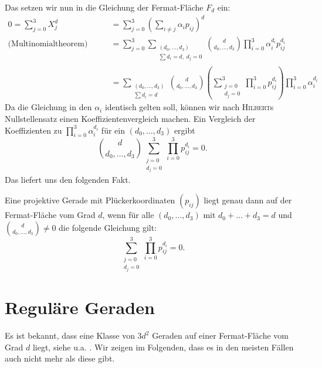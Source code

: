 Das setzen wir nun in die Gleichung der Fermat-Fläche $F_d$ ein:
\begin{align*}
0 = \sum_{j=0}^3 X_j^d &= \sum_{j=0}^3 \left(\sum_{i \neq j} \alpha_i p_{ij} \right)^d \\
\text{(Multinomialtheorem)}\qquad &= \sum_{j=0}^3 \sum_{\substack{(d_0,\dots,d_3) \\ \sum d_i=d,\;d_j=0}} \binom d{d_0,\dots,d_3} \prod_{i=0}^3 \alpha_i^{d_i} p_{ij}^{d_i} \\
	&= \sum_{\substack{(d_0,\dots,d_3) \\ \sum d_i=d}} \binom d{d_0,\dots,d_3} \left(\sum_{\substack{j=0 \\ d_j=0}}^3 \prod_{i=0}^3 p_{ij}^{d_i} \right) \prod_{i=0}^3 \alpha_i^{d_i}
\end{align*}
Da die Gleichung in den $\alpha_i$ identisch gelten soll, können wir nach \textsc{Hilbert}s Nullstellensatz einen Koeffizientenvergleich machen. Ein Vergleich der Koeffizienten zu $\prod_{i=0}^3 \alpha_i^{d_i}$ für ein $(d_0,\dots,d_3)$ ergibt
\begin{equation}
\binom d{d_0,\dots,d_3} \sum_{\substack{j=0 \\ d_j=0}}^3 \prod_{i=0}^3 p_{ij}^{d_i} = 0.
\end{equation}
Das liefert uns den folgenden Fakt.

\begin{fact}
Eine projektive Gerade mit Plückerkoordinaten $(p_{ij})$ liegt genau dann auf der Fermat-Fläche vom Grad $d$, wenn für alle $(d_0,\dots,d_3)$ mit $d_0 + \dots + d_3 = d$ und $\binom d{d_0,\dots,d_3} \neq 0$ die folgende Gleichung gilt:
\begin{equation}
\sum_{\substack{j=0 \\ d_j=0}}^3 \prod_{i=0}^3 p_{ij}^{d_i} = 0.
\end{equation}
\end{fact}

\section{Reguläre Geraden}
Es ist bekannt, dass eine Klasse von $3d^2$ Geraden auf einer Fermat-Fläche vom Grad $d$ liegt, siehe u.a. \cite[S.~5]{LinesOnFermat}. Wir zeigen im Folgenden, dass es in den meisten Fällen auch nicht mehr als diese gibt.

